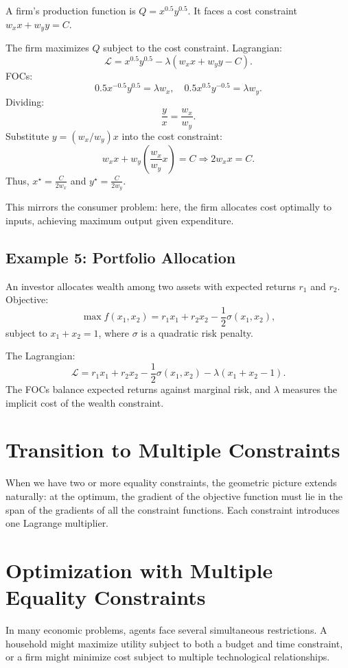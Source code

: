 \documentclass[12pt]{article}
\newcommand{\Lag}{\mathcal{L}}
\begin{document}
A firm’s production function is $Q = x^{0.5}y^{0.5}$. It faces a cost constraint $w_x x + w_y y = C$.

The firm maximizes $Q$ subject to the cost constraint. Lagrangian:
\[
\Lag = x^{0.5}y^{0.5} - \lambda(w_x x + w_y y - C).
\]
FOCs:
\[
0.5x^{-0.5}y^{0.5} = \lambda w_x, \quad 0.5x^{0.5}y^{-0.5} = \lambda w_y.
\]
Dividing:
\[
\frac{y}{x} = \frac{w_x}{w_y}.
\]
Substitute $y = (w_x/w_y)x$ into the cost constraint:
\[
w_x x + w_y \left(\frac{w_x}{w_y}x\right) = C \Rightarrow 2w_x x = C.
\]
Thus, $x^\star = \frac{C}{2w_x}$ and $y^\star = \frac{C}{2w_y}$.

This mirrors the consumer problem: here, the firm allocates cost optimally to inputs, achieving maximum output given expenditure.

\subsection*{Example 5: Portfolio Allocation}

An investor allocates wealth among two assets with expected returns $r_1$ and $r_2$. Objective:
\[
\max f(x_1, x_2) = r_1 x_1 + r_2 x_2 - \frac{1}{2}\sigma(x_1, x_2),
\]
subject to $x_1 + x_2 = 1$, where $\sigma$ is a quadratic risk penalty.

The Lagrangian:
\[
\Lag = r_1 x_1 + r_2 x_2 - \frac{1}{2}\sigma(x_1, x_2) - \lambda(x_1 + x_2 - 1).
\]
The FOCs balance expected returns against marginal risk, and $\lambda$ measures the implicit cost of the wealth constraint.

\section*{Transition to Multiple Constraints}

When we have two or more equality constraints, the geometric picture extends naturally: at the optimum, the gradient of the objective function must lie in the span of the gradients of all the constraint functions. Each constraint introduces one Lagrange multiplier.


\section*{Optimization with Multiple Equality Constraints}

In many economic problems, agents face several simultaneous restrictions. A household might maximize utility subject to both a budget and time constraint, or a firm might minimize cost subject to multiple technological relationships.  
\end{document}
